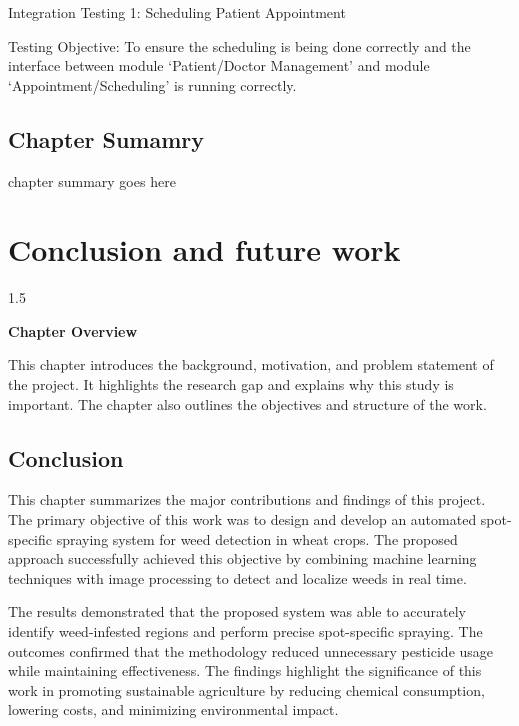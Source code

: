 \documentclass[A4paper,12pt]{report}
\theoremstyle{plain}
\theoremstyle{definition}
\theoremstyle{remark}
\numberwithin{equation}{section}
\begin{document}
Integration Testing 1:   Scheduling Patient Appointment

Testing Objective: To ensure the scheduling is being done correctly and the interface between module ‘Patient/Doctor Management’ and module ‘Appointment/Scheduling’ is running correctly.
\section{Chapter Sumamry}
chapter summary goes here


\newpage

\chapter{Conclusion and future work}
\thispagestyle{empty}
\newpage
\begin{spacing}{1.5}

\thispagestyle{empty}

{\centering \Large \bfseries Chapter Overview \par}
\vspace{1cm} %

This chapter introduces the background, motivation, and problem
statement of the project. It highlights the research gap and explains
why this study is important. The chapter also outlines the objectives
and structure of the work.



\section{Conclusion}
This chapter summarizes the major contributions and findings of this project. The primary objective of this work was to design and develop an automated spot-specific spraying system for weed detection in wheat crops. The proposed approach successfully achieved this objective by combining machine learning techniques with image processing to detect and localize weeds in real time.

The results demonstrated that the proposed system was able to
accurately identify weed-infested regions and perform precise
spot-specific spraying. The outcomes confirmed that the methodology
reduced unnecessary pesticide usage while maintaining effectiveness.
The findings highlight the significance of this work in promoting
sustainable agriculture by reducing chemical consumption, lowering
costs, and minimizing environmental impact.


\end{spacing}
\end{document}
